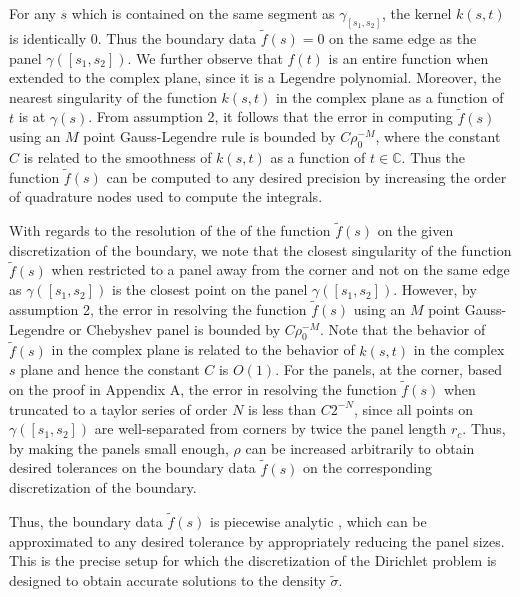 \documentclass[12pt]{article}
\begin{document}
For any $s$ which is contained on the same segment as $\gamma_{[s_{1},s_{2}]}$, the kernel $k(s,t)$ is identically $0$.
Thus the boundary data $\tilde{f}(s)=0$  on the same edge as the panel $\gamma([s_{1},s_{2}])$. 
We further observe that $f(t)$ is an entire function when extended to the complex plane, since it is a Legendre polynomial.
Moreover, the nearest singularity of the function $k(s,t)$ in the complex plane as a function of $t$ is at $\gamma(s)$.
From assumption 2, it follows that
the error in computing $\tilde{f}(s)$ using an $M$ point Gauss-Legendre rule is bounded by $C \rho_{0}^{-M}$, where
the constant $C$ is related to the smoothness of $k(s,t)$ as a function of $t \in \mathbb{C}.$
Thus the function $\tilde{f}(s)$ can be computed to any desired precision by increasing the order of quadrature nodes
used to compute the integrals. 


With regards to the resolution of the of the function $\tilde{f}(s)$ on the given discretization of the boundary, 
we note that the closest singularity of the function $\tilde{f}(s)$ when restricted to a panel away from the corner
and not on the same edge as $\gamma([s_{1},s_{2}])$ is the closest point on the panel $\gamma([s_{1},s_{2}])$. 
However, by assumption 2, the error in resolving the function $\tilde{f}(s)$ using an $M$ point Gauss-Legendre
or Chebyshev panel is bounded by $C \rho_{0}^{-M}$. Note that the behavior of $\tilde{f}(s)$ in the complex plane is related
to the behavior of $k(s,t)$ in the complex $s$ plane and hence the constant $C$ is $O(1)$.
For the panels, at the corner, based on the proof in Appendix A, the error in resolving the function $\tilde{f}(s)$ when
truncated to a taylor series of order $N$ is less than $C 2^{-N}$, since all points on $\gamma([s_{1},s_{2}])$ are 
well-separated from corners by twice the panel length $r_{c}$. Thus, by making the panels small enough, $\rho$ can be increased arbitrarily to obtain desired tolerances on the boundary data $\tilde{f}(s)$ on the corresponding discretization of the boundary. 
 
 Thus, the boundary data $\tilde{f}(s)$ is piecewise analytic , which can be approximated to any desired tolerance by appropriately reducing the panel sizes. This is the precise setup for which the discretization of the Dirichlet problem is designed to obtain accurate solutions to the density $\tilde{\sigma}$. 
 
 
 
\end{document}
